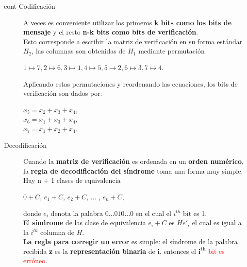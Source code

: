 \documentclass{beamer}
\theoremstyle{plain}
\theoremstyle{example}
\theoremstyle{example}
\begin{document}
\begin{frame}  \small


\begin{description}

\item[cont Codificación]

A veces es conveniente utilizar los primeros \textbf{k bits como los bits de mensaje} y el resto \textbf{n-k bits como bits de verificación}. \\
\vspace*{5pt}
Esto corresponde a escribir la matriz de verificación en su forma estándar $H_2$, las columnas son obtenidas de $H_1$ mediante permutación

\begin{center}
$1\mapsto 7, 2 \mapsto 6, 3 \mapsto 1, 4 \mapsto 5, 5\mapsto 2, 6  \mapsto 3, 7  \mapsto 4.$
\end{center}

Aplicando estas permutaciones y reordenando las ecuaciones, los bits de verificación son dados por:

\begin{center}
$x_5 =x_2 +x_3 +x_4$,\\	$x_6 =x_1 +x_3 +x_4$,\\	$x_7 =x_1 +x_2 +x_4.$
\end{center}


\end{description}
\end{frame} 

\begin{frame}  \small  

\begin{description}



\item[Decodificación] Cuando la \textbf{matriz de verificación} es ordenada en un \textbf{orden numérico}, la \textbf{regla de decodificación del síndrome} toma una forma muy simple.\\
\vspace*{5pt}
Hay n + 1 clases de equivalencia 

\begin{center}
$0+C$,	$e_1 +C$,	$e_2 +C$,	$\ldots$ ,	$e_n +C$,
\end{center}

donde $e_i$ denota la palabra $0\ldots 010\ldots 0$ en el cual el $i^{th}$ bit es 1. \\
\vspace*{10pt}
El \textbf{síndrome} de las clase de equivalencia $e_i + C$ es $He'_i$ el cual es igual a la $i^{th}$ columna de $H$. \\
\vspace*{15pt}
\textbf{La regla para corregir un error} es simple: el síndrome de la palabra recibida \textbf{z} es la \textbf{representación binaria} de $\mathbf{i}$, entonces el $\mathbf{i^{th}}$ \textcolor{red}{bit es erróneo}. 

\end{description}
\end{frame} 
\end{document}
